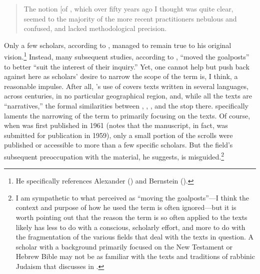  \begin{quote} The notion {[}of \rwb{]}, which over fifty years ago I thought was quite clear, seemed to the majority of the more recent practitioners nebulous and confused, and lacked methodological precision.\autocite[3]{vermes_zsengeller2014} \end{quote} 

 Only a few scholars, according to \vermes, managed to remain true to his original vision.\footnote{He specifically references   Alexander (\autocite*{alexander_carson-williamson1988}) and Bernstein   (\autocite*{bernstein_textus2005}).} Instead, many subsequent studies, according to \vermes, ``moved the goalposts'' to better ``suit the interest of their inquiry.''\autocite[4]{vermes_zsengeller2014} Yet, one cannot help but push back against \vermes here as scholars' desire to narrow the scope of the term is, I think, a reasonable impulse. After all, \vermes's use of \rwb covers texts written in several languages, across centuries, in no particular geographical region, and, while all the texts are ``narratives,'' the formal similarities between \ga, \ant, \jub, and the \pTarg stop there. \vermes specifically laments the narrowing of the term \rwb to primarily focusing on the \dss texts. Of course, when  was first published in 1961 (\vermes notes that the manuscript, in fact, was submitted for publication in 1959), only a small portion of the scrolls were published or accessible to more than a few specific scholars. But the field's subsequent preoccupation with the \qumran material, he suggests, is misguided.\footnote{I am sympathetic to what   \vermes perceived as ``moving the goalposts''---I   think the context and purpose of how he used the term   \rwb is often ignored---but it is worth pointing out   that the reason the term \rwb is so often applied to   the \qumran texts likely has less to do with a   conscious, scholarly effort, and more to do with the fragmentation of   the various fields that deal with the texts in question. A scholar   with a background primarily focused on the New Testament or Hebrew   Bible may not be as familiar with the texts and traditions of rabbinic   Judaism that \vermes discusses in   .} 

